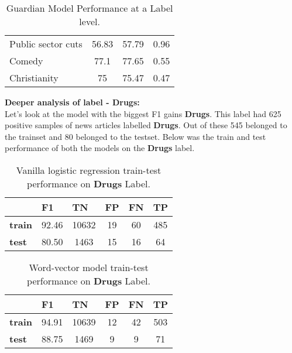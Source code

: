 \begin{table}[htbp]
\begin{tabular}{l|c|c|c|}
Public sector cuts         & 56.83                                                            & 57.79                                                        & 0.96                                                              \\
Comedy                     & 77.1                                                             & 77.65                                                        & 0.55                                                              \\
Christianity               & 75                                                               & 75.47                                                        & 0.47 
\end{tabular}
\caption{\label{tab:widgets}Guardian Model Performance at a Label level.}
\end{table}


\noindent \textbf{Deeper analysis of label - Drugs:}\\

Let's look at the model with the biggest F1 gains \textbf{Drugs}. This label had 625 positive samples of news articles labelled \textbf{Drugs}. Out of these 545 belonged to the trainset and 80 belonged to the testset. Below was the train and test performance of both the models on the \textbf{Drugs} label.

\begin{table}[htbp]
\centering
\begin{tabular}{l|c|c|c|c|c|}
 & \multicolumn{1}{l|}{\textbf{F1}} & \multicolumn{1}{l|}{\textbf{TN}} & \multicolumn{1}{l|}{\textbf{FP}} & \multicolumn{1}{l|}{\textbf{FN}} & \multicolumn{1}{l|}{\textbf{TP}} \\ \hline
\textbf{train} & 92.46 & 10632 & 19 & 60 & 485 \\
\textbf{test} & 80.50 & 1463 & 15 & 16 & 64
\end{tabular}
\caption{\label{tab:widgets}Vanilla logistic regression train-test performance on \textbf{Drugs} Label.}
\end{table}

\begin{table}[htbp]
\centering
\begin{tabular}{l|c|c|c|c|c|}
 & \multicolumn{1}{l|}{\textbf{F1}} & \multicolumn{1}{l|}{\textbf{TN}} & \multicolumn{1}{l|}{\textbf{FP}} & \multicolumn{1}{l|}{\textbf{FN}} & \multicolumn{1}{l|}{\textbf{TP}} \\ \hline
\textbf{train} & 94.91 & 10639 & 12 & 42 & 503 \\
\textbf{test} & 88.75 & 1469 & 9 & 9 & 71
\end{tabular}
\caption{\label{tab:widgets}Word-vector model train-test performance on \textbf{Drugs} Label.}
\end{table}

